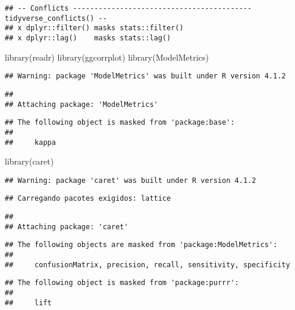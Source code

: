 \documentclass[
]{article}
\newenvironment{Shaded}{\begin{snugshade}}{\end{snugshade}}
\newcommand{\FunctionTok}[1]{\textcolor[rgb]{0.00,0.00,0.00}{#1}}
\newcommand{\NormalTok}[1]{#1}
\begin{document}
\begin{verbatim}
## -- Conflicts ------------------------------------------ tidyverse_conflicts() --
## x dplyr::filter() masks stats::filter()
## x dplyr::lag()    masks stats::lag()
\end{verbatim}

\begin{Shaded}
\begin{Highlighting}[]
\FunctionTok{library}\NormalTok{(readr)}
\FunctionTok{library}\NormalTok{(ggcorrplot)}
\FunctionTok{library}\NormalTok{(ModelMetrics)}
\end{Highlighting}
\end{Shaded}

\begin{verbatim}
## Warning: package 'ModelMetrics' was built under R version 4.1.2
\end{verbatim}

\begin{verbatim}
## 
## Attaching package: 'ModelMetrics'
\end{verbatim}

\begin{verbatim}
## The following object is masked from 'package:base':
## 
##     kappa
\end{verbatim}

\begin{Shaded}
\begin{Highlighting}[]
\FunctionTok{library}\NormalTok{(caret)}
\end{Highlighting}
\end{Shaded}

\begin{verbatim}
## Warning: package 'caret' was built under R version 4.1.2
\end{verbatim}

\begin{verbatim}
## Carregando pacotes exigidos: lattice
\end{verbatim}

\begin{verbatim}
## 
## Attaching package: 'caret'
\end{verbatim}

\begin{verbatim}
## The following objects are masked from 'package:ModelMetrics':
## 
##     confusionMatrix, precision, recall, sensitivity, specificity
\end{verbatim}

\begin{verbatim}
## The following object is masked from 'package:purrr':
## 
##     lift
\end{verbatim}
\end{document}
